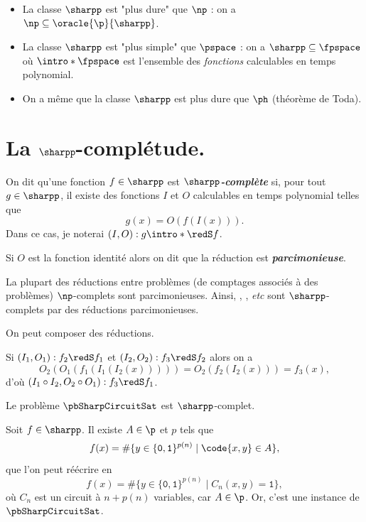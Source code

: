 \documentclass[./main]{subfiles}
\begin{document}
  \begin{rmk}
    \begin{itemize}
      \item La classe $\sharpp$ est "plus dure" que $\np$ : on a $\np \subseteq \oracle{\p}{\sharpp}$.
      \item La classe $\sharpp$ est "plus simple" que $\pspace$ : on a $\sharpp \subseteq \fpspace$ où $\intro*\fpspace$ est l'ensemble des \textit{fonctions} calculables en temps polynomial.
      \item On a même que la classe $\sharpp$ est plus dure que $\ph$ (théorème de Toda).
    \end{itemize}
  \end{rmk}

  \section{La $\sharpp$-complétude.}

  \begin{defn}
    On dit qu'une fonction $f \in \sharpp$ est \textit{\textbf{$\sharpp$-complète}} si, pour tout $g \in \sharpp$, il existe des fonctions $I$ et $O$ calculables en temps polynomial telles que
    \[
    g(x) = O(f(I(x)))
    .\]
    Dans ce cas, je noterai $(I, O) : g \intro*\redS f$.

    Si $O$ est la fonction identité alors on dit que la réduction est \textit{\textbf{parcimonieuse}}.
  \end{defn}

  La plupart des réductions entre problèmes (de comptages associés à des problèmes) $\np$-complets sont parcimonieuses.
  Ainsi, \pbSharpSat, \pbSharpChemHam, \textit{etc} sont $\sharpp$-complets par des réductions parcimonieuses.

  \showSharpChemHam


  On peut composer des réductions.

  \begin{lem}
    Si $(I_1, O_1) : f_2 \redS f_1$ et $(I_2, O_2) : f_3 \redS f_2$ alors on a
    \[
    O_2(O_1(f_1(I_1(I_2(x))))) = O_2(f_2(I_2(x))) = f_3(x)
    ,\] 
    d'où $(I_1 \circ I_2, O_2 \circ O_1) : f_3 \redS f_1$.
  \end{lem}

  \begin{thm}
    Le problème $\pbSharpCircuitSat$ est  $\sharpp$-complet.
    \showSharpCircuitSat
  \end{thm}
  \begin{prv}
    Soit $f \in \sharpp$.
    Il existe $A \in \p$ et $p$ tels que \[
      f(x) = \# \{y \in \{\texttt{0},\texttt{1}\}^{p(n)}  \mid \code{x, y} \in A\} 
    ,\]
    que l'on peut réécrire en
    \[
      f(x) = \# \{y \in \{\texttt{0},\texttt{1}\}^{p(n)}  \mid C_n(x,y) = \texttt{1}\} 
    ,\] 
    où $C_n$ est un circuit à $n + p(n)$ variables, car $A \in \p$. Or, c'est
    une instance de $\pbSharpCircuitSat$.
  \end{prv}
\end{document}
